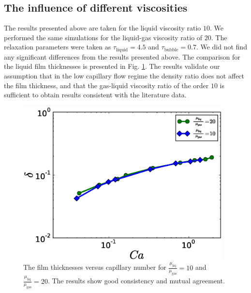 \documentclass[preprint,12pt]{elsarticle}
\begin{document}
\subsection{The influence of different viscosities}
The results presented above are taken for the liquid viscosity ratio $10$.
We performed the same simulations for the liquid-gas viscosity ratio of $20$.
The relaxation parameters were taken as $\tau_{\mathrm{liquid}}=4.5$ and $\tau_{\mathrm{bubble}}=0.7$. We
did not find any significant differences from the results presented above. The
comparison for the liquid film thicknesses is presented in Fig.
\ref{fig:capillary:viscous}. The results validate our assumption that in
the low capillary flow regime the density ratio does not affect the film thickness,
and that the gas-liquid viscosity ratio of the order $10$ is sufficient to obtain results
consistent with the literature data.
\begin{figure}
\includegraphics[width=0.97\textwidth]{Figures/Capillary_Viscous/capillaries_viscous.eps}
\caption{The film thicknesses versus capillary number for
$\frac{\mu_{\mathrm{liq}}}{\mu_{\mathrm{gas}}}=10$ and $\frac{\mu_{\mathrm{liq}}}{\mu_{\mathrm{gas}}}=20$. The
results show good consistency and mutual agreement.\label{fig:capillary:viscous}}
\end{figure}
\end{document}
